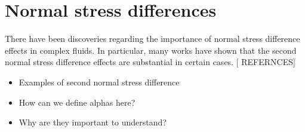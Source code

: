\section{Normal stress differences}
There have been discoveries regarding the importance of normal stress difference effects in complex fluids. In particular, many works have shown that the second normal stress difference effects are substantial in certain cases. [{\color{blue} REFERNCES}]

\begin{itemize}
  \item Examples of second normal stress difference
  \item How can we define alphas here? 
  \item Why are they important to understand? 
\end{itemize}

